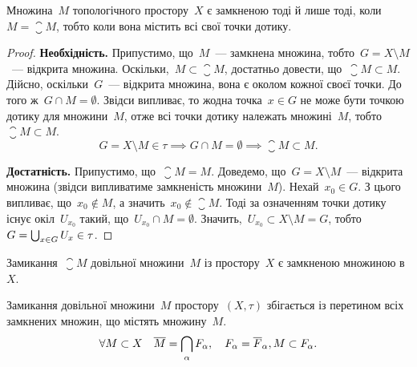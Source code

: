 \begin{theorem}
    Множина~$M$ топологічного простору~$X$ є замкненою тоді й лише тоді, коли~$M = \closure M$, тобто коли вона містить всі свої точки дотику.
\end{theorem}

\begin{proof}
    \textbf{Необхідність.} Припустимо, що~$M$~--- замкнена множина, тобто~$G = X \setminus M$~--- відкрита множина. Оскільки,~$M \subset \closure M$, достатньо довести, що~$\closure M \subset M$. Дійсно, оскільки~$G$~--- відкрита множина, вона є околом кожної своєї точки. До того ж~$G \cap M = \emptyset$. Звідси випливає, то жодна точка~$x \in G$ не може бути точкою дотику для множини~$M$, отже всі точки дотику належать множині~$M$, тобто~$\closure M \subset M$.
    \begin{equation*}
        G = X \setminus M \in \tau \implies G \cap M = \emptyset \implies \closure M \subset M.
    \end{equation*}

    \textbf{Достатність.} Припустимо, що~$\closure M = M$. Доведемо, що~$G = X \setminus M$~--- відкрита множина (звідси випливатиме замкненість множини~$M$). Нехай~$x_0 \in G$. З цього випливає, що~$x_0 \not\in M$, а значить~$x_0 \not\in \closure M$. Тоді за означенням точки дотику існує окіл~$U_{x_0}$ такий, що~$U_{x_0} \cap M = \emptyset$. Значить,~$U_{x_0} \subset X \setminus M = G$, тобто~$G = \operatorname*{\bigcup}_{x \in G} U_x \in \tau$.
\end{proof}

\begin{corollary}
    Замикання~$\closure M$ довільної множини~$M$ із простору~$X$ є замкненою множиною в~$X$.
\end{corollary}

\begin{theorem}
    Замикання довільної множини~$M$ простору~$(X, \tau)$ збігається із перетином всіх замкнених множин, що містять множину~$M$.
    \begin{equation*}
        \forall M \subset X \quad \overline{M} = \operatorname*{\bigcap}_\alpha F_\alpha, \quad F_\alpha = \overline{F}_\alpha, M \subset F_\alpha.
    \end{equation*}
\end{theorem}

